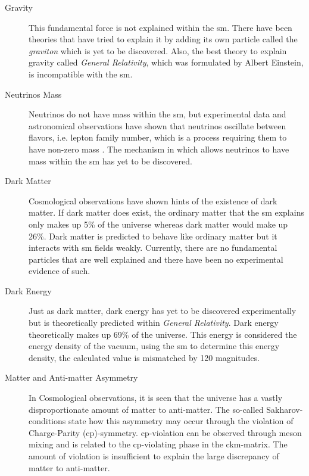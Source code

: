 \begin{description}
    \item[Gravity] This fundamental force is not explained within the \gls{sm}. There have been theories 
    that have tried to explain it by adding its own particle called the \textit{graviton} which is yet to 
    be discovered. Also, the best theory to explain gravity called \textit{General Relativity}, which was 
    formulated by Albert Einstein, is incompatible with the \gls{sm}.
    \item[Neutrinos Mass]  Neutrinos do not have mass within the \gls{sm}, but experimental data and astronomical 
    observations have shown that neutrinos oscillate between flavors, i.e. lepton family number, which 
    is a process requiring them to have non-zero mass \cite{neutrino-oscl}. The mechanism in which allows neutrinos to have mass 
    within the \gls{sm} has yet to be discovered.
    \item[Dark Matter] Cosmological observations have shown hints of the existence of dark matter. If dark 
    matter does exist, the ordinary matter that the \gls{sm} explains only makes up 5\% of the universe whereas 
    dark matter would make up 26\%. Dark matter is predicted to behave like ordinary matter but it interacts with 
    \gls{sm} fields weakly. Currently, there are no fundamental particles that are well explained and there have been no
    experimental evidence of such.
    \item[Dark Energy] Just as dark matter, dark energy has yet to be discovered experimentally but is 
    theoretically predicted within \textit{General Relativity}. Dark energy theoretically makes up 69\% 
    of the universe. This energy is considered the energy density of the vacuum, using the \gls{sm} to 
    determine this energy density, the calculated value is mismatched by 120 magnitudes.
    \item[Matter and Anti-matter Asymmetry] In Cosmological observations, it is seen that the universe has a vastly 
    disproportionate amount of matter to anti-matter. The so-called Sakharov-conditions \cite{sakharov} state how this 
    asymmetry may occur through the violation of Charge-Parity (\gls{cp})-symmetry. \gls{cp}-violation can be 
    observed through meson mixing \cite{Christenson} and is related to the \gls{cp}-violating phase in the \gls{ckm}-matrix. The 
    amount of violation is insufficient to explain the large discrepancy of matter to anti-matter. 
    
\end{description}

